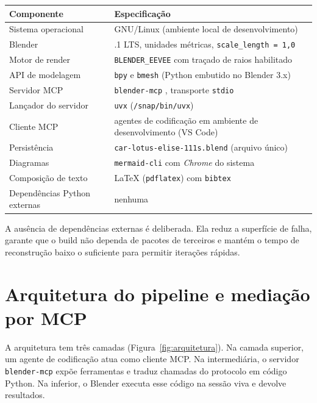 \begin{quadro}[htbp]
\centering
\caption{Ambiente computacional e vers\~oes}
\label{qua:ambiente}
\footnotesize
\begin{tabular}{>{\raggedright\arraybackslash}p{3.6cm}>{\raggedright\arraybackslash}p{8.6cm}}
\toprule
\textbf{Componente} & \textbf{Especifica{\c{c}}\~ao} \\
\midrule
Sistema operacional & GNU/Linux (ambiente local de desenvolvimento) \\
Blender & 5.2.1 LTS, unidades m\'etricas, \texttt{scale\_length = 1,0} \\
Motor de render & \texttt{BLENDER\_EEVEE} com tra{\c{c}}ado de raios habilitado \\
API de modelagem & \texttt{bpy} e \texttt{bmesh} (Python embutido no Blender 3.x) \\
Servidor MCP & \texttt{blender-mcp} \cite{blendermcp2025}, transporte \texttt{stdio} \\
Lan{\c{c}}ador do servidor & \texttt{uvx} (\texttt{/snap/bin/uvx}) \\
Cliente MCP & agentes de codifica{\c{c}}\~ao em ambiente de desenvolvimento (VS Code) \\
Persist\^encia & \texttt{car-lotus-elise-111s.blend} (arquivo \'unico) \\
Diagramas & \texttt{mermaid-cli} com \emph{Chrome} do sistema \\
Composi{\c{c}}\~ao de texto & \LaTeX{} (\texttt{pdflatex}) com \texttt{bibtex} \\
Depend\^encias Python externas & nenhuma \\
\bottomrule
\end{tabular}
\end{quadro}

A aus\^encia de depend\^encias externas \'e deliberada. Ela reduz a superf\'icie de
falha, garante que o build n\~ao dependa de pacotes de terceiros e mant\'em o tempo de
reconstru{\c{c}}\~ao baixo o suficiente para permitir itera{\c{c}}\~oes r\'apidas.

\section{Arquitetura do pipeline e media{\c{c}}\~ao por MCP}

A arquitetura tem tr\^es camadas (Figura~\ref{fig:arquitetura}). Na camada superior, um agente
de codifica{\c{c}}\~ao atua como cliente MCP. Na intermedi\'aria, o servidor
\texttt{blender-mcp} exp\~oe ferramentas e traduz chamadas do protocolo em c\'odigo Python. Na
inferior, o Blender executa esse c\'odigo na sess\~ao viva e devolve resultados.

